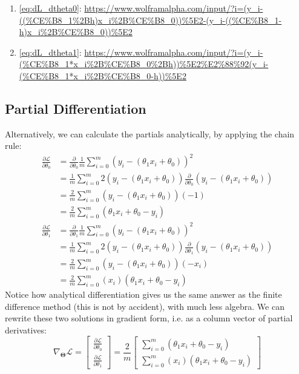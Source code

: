 \documentclass[12pt,initial,twoside,maitrise]{dms}
\numberwithin{equation}{section}
\numberwithin{table}{chapter}
\numberwithin{figure}{chapter}
\begin{document}
%
\begin{enumerate}
    \item[] \autoref{eq:dL_dtheta0}: \url{https://www.wolframalpha.com/input/?i=(y_i-((%CE%B8_1%2Bh)x_i%2B%CE%B8_0))%5E2-(y_i-((%CE%B8_1-h)x_i%2B%CE%B8_0))%5E2}
    \item[] \autoref{eq:dL_dtheta1}: \url{https://www.wolframalpha.com/input/?i=(y_i-(%CE%B8_1*x_i%2B%CE%B8_0%2Bh))%5E2%E2%88%92(y_i-(%CE%B8_1*x_i%2B%CE%B8_0-h))%5E2}
\end{enumerate}

\subsection{Partial Differentiation}

\noindent Alternatively, we can calculate the partials analytically, by applying the chain rule:
%
\begin{align}
\frac{\partial\mathcal{L}}{\partial \theta_0} & = \frac{\partial}{\partial \theta_0}\frac{1}{m}\sum_{i=0}^m(y_i - (\theta_1 x_i + \theta_0))^2 \\ & = \frac{1}{m}\sum_{i=0}^m 2 (y_i - (\theta_1 x_i + \theta_0))\frac{\partial}{\partial \theta_0}(y_i - (\theta_1 x_i + \theta_0)) \\ & = \frac{2}{m}\sum_{i=0}^m(y_i - (\theta_1 x_i + \theta_0))(-1) \\ & = \boxed{\frac{2}{m}\sum_{i=0}^m(\theta_1 x_i + \theta_0 - y_i)}
\end{align}
%
\begin{align}
\frac{\partial\mathcal{L}}{\partial \theta_1} & = \frac{\partial}{\partial \theta_1}\frac{1}{m}\sum_{i=0}^m(y_i - (\theta_1 x_i + \theta_0))^2 \\ & = \frac{1}{m}\sum_{i=0}^m 2(y_i - (\theta_1 x_i + \theta_0)) \frac{\partial}{\partial \theta_1}(y_i - (\theta_1 x_i + \theta_0)) \\ & = \frac{2}{m}\sum_{i=0}^m(y_i - (\theta_1 x_i + \theta_0))(-x_i) \\ & = \boxed{\frac{2}{m}\sum_{i=0}^m(x_i)(\theta_1 x_i + \theta_0 - y_i)}
\end{align}
%
Notice how analytical differentiation gives us the same answer as the finite difference method (this is not by accident), with much less algebra. We can rewrite these two solutions in gradient form, i.e. as a column vector of partial derivatives:
%
\begin{equation}
\nabla_\mathbf{\Theta}\mathcal{L} =
\begin{bmatrix}
\frac{\partial\mathcal{L}}{\partial \theta_0} \\
\frac{\partial\mathcal{L}}{\partial \theta_1}
\end{bmatrix} = \frac{2}{m}
\begin{bmatrix}
\sum_{i=0}^m(\theta_1 x_i + \theta_0 - y_i) \\ \sum_{i=0}^m(x_i)(\theta_1 x_i + \theta_0 - y_i)
\end{bmatrix}
\end{equation}
\end{document}
